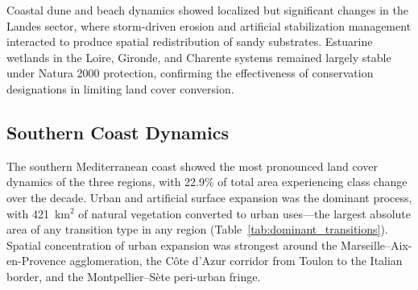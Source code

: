 \documentclass[remotesensing,article,submit,pdftex,moreauthors]{Definitions/mdpi}
\begin{document}
Coastal dune and beach dynamics showed localized but significant changes in the Landes sector, where storm-driven erosion and artificial stabilization management interacted to produce spatial redistribution of sandy substrates. Estuarine wetlands in the Loire, Gironde, and Charente systems remained largely stable under Natura 2000 protection, confirming the effectiveness of conservation designations in limiting land cover conversion.

\subsection{Southern Coast Dynamics}

The southern Mediterranean coast showed the most pronounced land cover dynamics of the three regions, with 22.9\% of total area experiencing class change over the decade. Urban and artificial surface expansion was the dominant process, with 421~km$^2$ of natural vegetation converted to urban uses—the largest absolute area of any transition type in any region (Table~\ref{tab:dominant_transitions}). Spatial concentration of urban expansion was strongest around the Marseille--Aix-en-Provence agglomeration, the Côte d'Azur corridor from Toulon to the Italian border, and the Montpellier--Sète peri-urban fringe.
\end{document}
